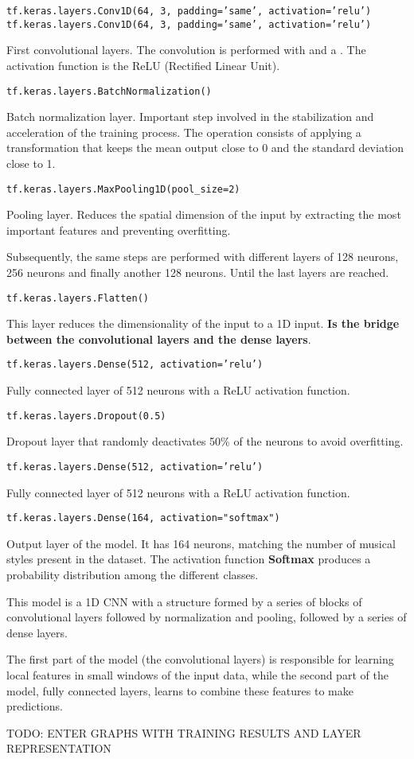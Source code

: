\texttt{tf.keras.layers.Conv1D(64, 3, padding='same', activation='relu')}
\texttt{tf.keras.layers.Conv1D(64, 3, padding='same', activation='relu')}

First convolutional layers. The convolution is performed with  and a . The activation function is the ReLU (Rectified Linear Unit).

\texttt{tf.keras.layers.BatchNormalization()}

Batch normalization layer. Important step involved in the stabilization and acceleration of the training process. The operation consists of applying a transformation that keeps the mean output close to 0 and the standard deviation close to 1.

\texttt{tf.keras.layers.MaxPooling1D(pool\_size=2)}

Pooling layer. Reduces the spatial dimension of the input by extracting the most important features and preventing overfitting.

Subsequently, the same steps are performed with different layers of 128 neurons, 256 neurons and finally another 128 neurons. Until the last layers are reached.

\texttt{tf.keras.layers.Flatten()}

This layer reduces the dimensionality of the input to a 1D input. \textbf{Is the bridge between the convolutional layers and the dense layers}.

\texttt{tf.keras.layers.Dense(512, activation='relu')}

Fully connected layer of 512 neurons with a ReLU activation function.

\texttt{tf.keras.layers.Dropout(0.5)}

Dropout layer that randomly deactivates 50\% of the neurons to avoid overfitting.

\texttt{tf.keras.layers.Dense(512, activation='relu')}

Fully connected layer of 512 neurons with a ReLU activation function.

\texttt{tf.keras.layers.Dense(164, activation="softmax")}

Output layer of the model. It has 164 neurons, matching the number of musical styles present in the dataset. The activation function \textbf{Softmax} produces a probability distribution among the different classes.

This model is a 1D CNN with a structure formed by a series of blocks of convolutional layers followed by normalization and pooling, followed by a series of dense layers.

The first part of the model (the convolutional layers) is responsible for learning local features in small windows of the input data, while the second part of the model, fully connected layers, learns to combine these features to make predictions.

TODO: ENTER GRAPHS WITH TRAINING RESULTS AND LAYER REPRESENTATION